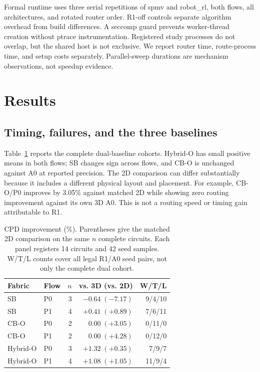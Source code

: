 \documentclass[conference,10pt]{IEEEtran}
\begin{document}
Formal runtime uses three serial repetitions of spmv and robot\_rl, both flows, all architectures, and rotated router order. R1-off controls separate algorithm overhead from build differences. A seccomp guard prevents worker-thread creation without ptrace instrumentation. Registered study processes do not overlap, but the shared host is not exclusive. We report router time, route-process time, and setup costs separately. Parallel-sweep durations are mechanism observations, not speedup evidence.

\clearpage
\section{Results}
\subsection{Timing, failures, and the three baselines}
Table~\ref{tab:main} reports the complete dual-baseline cohorts. Hybrid-O has small positive means in both flows; SB changes sign across flows, and CB-O is unchanged against A0 at reported precision. The 2D comparison can differ substantially because it includes a different physical layout and placement. For example, CB-O/P0 improves by 3.05\% against matched 2D while showing zero routing improvement against its own 3D A0. This is not a routing speed or timing gain attributable to R1.

\begin{table}[h]
\centering\caption{CPD improvement (\%). Parentheses give the matched 2D comparison on the same $n$ complete circuits. Each panel registers 14 circuits and 42 seed samples. W/T/L counts cover all legal R1/A0 seed pairs, not only the complete dual cohort.}
\label{tab:main}
\begin{tabular}{llrrr}\hline
Fabric & Flow & $n$ & vs. 3D (vs. 2D) & W/T/L\\\hline
SB & P0 &3&$-0.64\;(-7.17)$&9/4/10\\
SB & P1 &4&$+0.41\;(+0.89)$&7/6/11\\
CB-O & P0 &2&$0.00\;(+3.05)$&0/11/0\\
CB-O & P1 &2&$0.00\;(+4.28)$&0/12/0\\
Hybrid-O & P0 &3&$+1.32\;(+0.35)$&7/9/7\\
Hybrid-O & P1 &4&$+1.08\;(+1.05)$&11/9/4\\\hline
\end{tabular}
\end{table}
\end{document}
